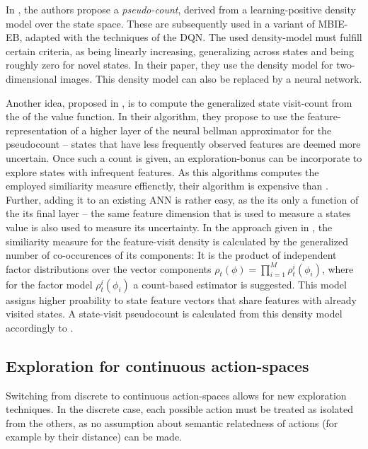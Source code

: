 In \cite{bellemare_unifying_2016}, the authors propose a \textit{pseudo-count}, derived from a learning-positive density model over the state space. These are subsequently used in a variant of MBIE-EB, adapted with the techniques of the DQN. The used density-model must fulfill certain criteria, as being linearly increasing, generalizing across states and being roughly zero for novel states. In their paper, they use the  density model for two-dimensional images. This density model can also be replaced by a neural network.

Another idea, proposed in \cite{martin_count-based_2017}, is to compute the generalized state visit-count from the  of the value function. In their algorithm, they propose to use the feature-representation of a higher layer of the neural bellman approximator for the pseudocount -- states that have less frequently observed features are deemed more uncertain. Once such a count is given, an exploration-bonus can be incorporate to explore states with infrequent features. As this algorithms computes the employed similiarity measure effienctly, their algorithm is expensive than \cite{bellemare_unifying_2016}. Further, adding it to an existing ANN is rather easy, as the its only a function of the its final layer -- the same feature dimension that is used to measure a states value is also used to measure its uncertainty. In the approach given in \cite{martin_count-based_2017}, the similiarity measure for the feature-visit density is calculated by the generalized number of co-occurences of its components: It is the product of independent factor distributions over the vector components $\rho_t(\phi) = \prod_{i=1}^{M}\rho_t^i(\phi_i)$, where for the factor model $\rho_t^i(\phi_i)$ a count-based estimator is suggested. This model assigns higher proability to state feature vectors that share features with already visited states. A state-visit pseudocount is calculated from this density model accordingly to \cite{bellemare_unifying_2016}. 


\subsection{Exploration for continuous action-spaces}

\label{sec:contexptheory}

Switching from discrete to continuous action-spaces allows for new exploration techniques. In the discrete case, each possible action must be treated as isolated from the others, as no assumption about semantic relatedness of actions (for example by their distance) can be made. 

